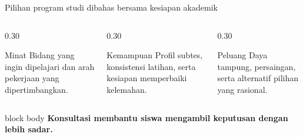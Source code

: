 \begin{frame}{Pilihan program studi dibahas bersama kesiapan akademik}
  \begin{columns}[T,onlytextwidth]
    \begin{column}{0.30\textwidth}
      \begin{block}{Minat}
        Bidang yang ingin dipelajari dan arah pekerjaan yang dipertimbangkan.
      \end{block}
    \end{column}
    \begin{column}{0.30\textwidth}
      \begin{block}{Kemampuan}
        Profil subtes, konsistensi latihan, serta kesiapan memperbaiki kelemahan.
      \end{block}
    \end{column}
    \begin{column}{0.30\textwidth}
      \begin{block}{Peluang}
        Daya tampung, persaingan, serta alternatif pilihan yang rasional.
      \end{block}
    \end{column}
  \end{columns}
  \vspace{0.28cm}
  \begin{beamercolorbox}[rounded=true,sep=0.20cm,wd=\textwidth]{block body}
    \centering\bfseries Konsultasi membantu siswa mengambil keputusan dengan lebih sadar.
  \end{beamercolorbox}
\end{frame}

